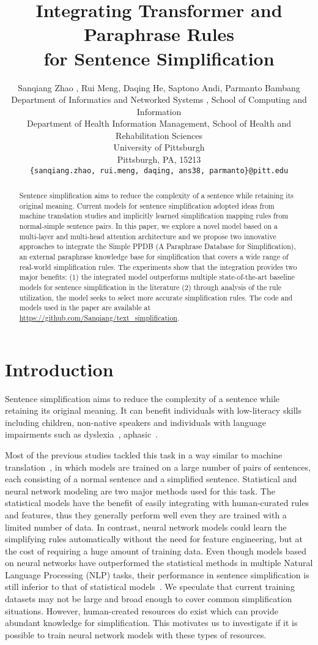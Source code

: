 \documentclass[11pt,a4paper]{article}
\title{Integrating Transformer and Paraphrase Rules \\ for Sentence Simplification}
\author{Sanqiang Zhao
, Rui Meng, Daqing He, Saptono Andi, Parmanto Bambang \\
   Department of Informatics and Networked Systems
, School of Computing and Information  \\
   Department of Health Information Management, School of Health and Rehabilitation Sciences \\
  University of Pittsburgh \\
  Pittsburgh, PA, 15213 \\
  {\tt \{sanqiang.zhao, rui.meng, daqing, ans38, parmanto\}@pitt.edu} 
\\}
\date{}
\begin{document}
\maketitle
\begin{abstract}
Sentence simplification aims to reduce the complexity of a sentence while retaining its original meaning. Current models for sentence simplification adopted ideas from machine translation studies and implicitly learned simplification mapping rules from normal-simple sentence pairs. In this paper, we explore a novel model based on a multi-layer and multi-head attention architecture and we propose two innovative approaches to integrate the Simple PPDB (A Paraphrase Database for Simplification), an external paraphrase knowledge base for simplification that covers a wide range of real-world simplification rules. The experiments show that the integration provides two major benefits: (1) the integrated model outperforms multiple state-of-the-art baseline models for sentence simplification in the literature (2) through analysis of the rule utilization, the model seeks to select more accurate simplification rules. The code and models used in the paper are available at \url{https://github.com/Sanqiang/text_simplification}.
  
\end{abstract}

\section{Introduction}

Sentence simplification aims to reduce the complexity of a sentence while retaining its original meaning. It can benefit individuals with low-literacy skills ~\cite{watanabe2009facilita} including children, non-native speakers and individuals with language impairments such as dyslexia~\cite{rello2013dyswebxia}, aphasic~\cite{carroll1999simplifying}.

Most of the previous studies tackled this task in a way similar to machine translation~\cite{xu2015show, zhang2017sentence}, in which models are trained on a large number of pairs of sentences, each consisting of a normal sentence and a simplified sentence. Statistical and neural network modeling are two major methods used for this task. The statistical models have the benefit of easily integrating with human-curated rules and features, thus they generally perform well even they are trained with a limited number of data. In contrast, neural network models could learn the simplifying rules automatically without the need for feature engineering, but at the cost of requiring a huge amount of training data. Even though models based on neural networks have outperformed the statistical methods in multiple Natural Language Processing (NLP) tasks, their performance in sentence simplification is still inferior to that of statistical models~\cite{xu2015show, zhang2017sentence}. We speculate that current training datasets may not be large and broad enough to cover common simplification situations. However, human-created resources do exist which can provide abundant knowledge for simplification. This motivates us to investigate if it is possible to train neural network models with these types of resources.
\end{document}
